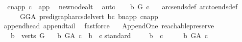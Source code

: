 \begin{isabellebody}
\ \ c{\isacharunderscore}{\kern0pt}napp{\isacharcolon}{\kern0pt}\ {\isachardoublequoteopen}c\ {\isasymnoteq}\ app{\isachardoublequoteclose}\ \isamarkupfalse%
\ new{\isacharunderscore}{\kern0pt}node{\isacharunderscore}{\kern0pt}alt\ \isamarkupfalse%
\ auto\isanewline
\ \ \isamarkupfalse%
\ {\isachardoublequoteopen}b\ {\isasymrightarrow}\isactrlbsub G\isactrlesub \ c{\isachardoublequoteclose}\ \ \isamarkupfalse%
\ arcs{\isacharunderscore}{\kern0pt}ends{\isacharunderscore}{\kern0pt}def\ arc{\isacharunderscore}{\kern0pt}to{\isacharunderscore}{\kern0pt}ends{\isacharunderscore}{\kern0pt}def\isanewline
\ \ \ \ \isamarkupfalse%
\ GG{\isacharunderscore}{\kern0pt}A\ pre{\isacharunderscore}{\kern0pt}digraph{\isachardot}{\kern0pt}arcs{\isacharunderscore}{\kern0pt}del{\isacharunderscore}{\kern0pt}vert\ bc\ b{\isacharunderscore}{\kern0pt}napp\ c{\isacharunderscore}{\kern0pt}napp\isanewline
\ \ \ \ \isamarkupfalse%
\ append{\isacharunderscore}{\kern0pt}head\ append{\isacharunderscore}{\kern0pt}tail\ \isamarkupfalse%
\ fastforce\ \isanewline
{}\isamarkupfalse%
%
\endisatagproof
{\isafoldproof}%
%
\isadelimproof
\isanewline
%
\endisadelimproof
\isanewline
\isanewline
{}\isamarkupfalse%
\ {\isacharparenleft}{\kern0pt}\ Append{\isacharunderscore}{\kern0pt}One{\isacharparenright}{\kern0pt}\ reachable{}{\isacharunderscore}{\kern0pt}preserve{\isacharcolon}{\kern0pt}\isanewline
\ \ \ {\isachardoublequoteopen}b\ {\isasymin}\ verts\ G{\isachardoublequoteclose}\isanewline
\ \ \ {\isachardoublequoteopen}{\isacharparenleft}{\kern0pt}b\ {\isasymrightarrow}\isactrlsup {\isacharplus}{\kern0pt}\isactrlbsub G{\isacharunderscore}{\kern0pt}A\isactrlesub \ c{\isacharparenright}{\kern0pt}\ {\isasymlongleftrightarrow}\ b\ {\isasymrightarrow}\isactrlsup {\isacharplus}{\kern0pt}\ c{\isachardoublequoteclose}\isanewline
%
\isadelimproof
%
\endisadelimproof
%
\isatagproof
{}\isamarkupfalse%
{\isacharparenleft}{\kern0pt}standard{\isacharparenright}{\kern0pt}\isanewline
\ \ \isamarkupfalse%
\ \ {\isachardoublequoteopen}b\ {\isasymrightarrow}\isactrlsup {\isacharplus}{\kern0pt}\ c{\isachardoublequoteclose}\isanewline
\ \ \isamarkupfalse%
\ \isamarkupfalse%
\ {\isachardoublequoteopen}b\ {\isasymrightarrow}\isactrlsup {\isacharplus}{\kern0pt}\isactrlbsub G{\isacharunderscore}{\kern0pt}A\isactrlesub \ c{\isachardoublequoteclose}\isanewline

\end{isabellebody}
